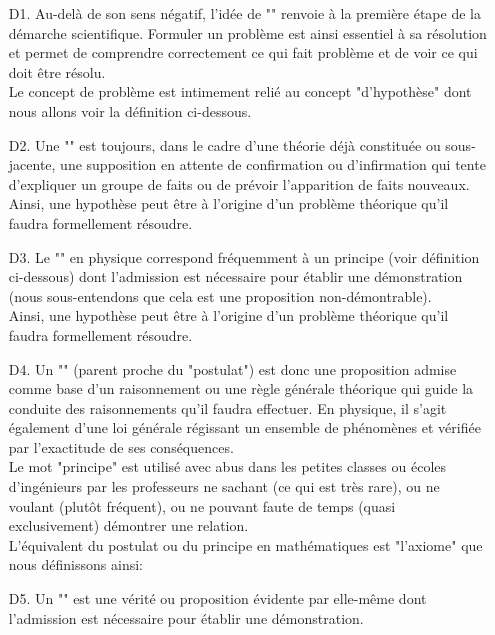 \begin{itemize}
	\item[D1.] Au-delà de son sens négatif, l'idée de "" renvoie à la première étape de la démarche scientifique. Formuler un problème est ainsi essentiel à sa résolution et permet de comprendre correctement ce qui fait problème et de voir ce qui doit être résolu.\\
	
	Le concept de problème est intimement relié au concept "d'hypothèse" dont nous allons voir la définition ci-dessous.

	\item[D2.] Une "" est toujours, dans le cadre d'une théorie déjà constituée ou sous-jacente, une supposition en attente de confirmation ou d'infirmation qui tente d'expliquer un groupe de faits ou de prévoir l'apparition de faits nouveaux.\\
	
	Ainsi, une hypothèse peut être à l'origine d'un problème théorique qu'il faudra formellement résoudre. 

	\item[D3.] Le "" en physique correspond fréquemment à un principe (voir définition ci-dessous) dont l'admission est nécessaire pour établir une démonstration (nous sous-entendons que cela est une proposition non-démontrable).\\
	
	Ainsi, une hypothèse peut être à l'origine d'un problème théorique qu'il faudra formellement résoudre. 

	\item[D4.] Un "" (parent proche du "postulat") est donc une proposition admise comme base d'un raisonnement ou une règle générale théorique qui guide la conduite des raisonnements qu'il faudra effectuer. En physique, il s'agit également d'une loi générale régissant un ensemble de phénomènes et vérifiée par l'exactitude de ses conséquences.\\
	
	Le mot "principe" est utilisé avec abus dans les petites classes ou écoles d'ingénieurs par les professeurs ne sachant (ce qui est très rare), ou ne voulant (plutôt fréquent), ou ne pouvant faute de temps (quasi exclusivement) démontrer une relation.\\

	L'équivalent du postulat ou du principe en mathématiques est "l'axiome" que nous définissons ainsi:

	\item[D5.] Un "" est une vérité ou proposition évidente par elle-même dont l'admission est nécessaire pour établir une démonstration.\label{axiom} 
\end{itemize}

